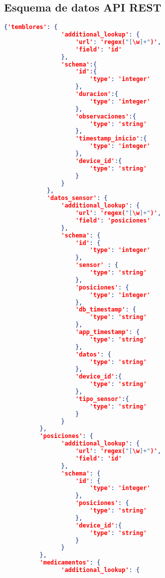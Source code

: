 \subsection{Esquema de datos API REST} \label{esquema_datos}
\begin{lstlisting}[language=json,firstnumber=1]
{'temblores': {
                'additional_lookup': {
                    'url': 'regex("[\w]+")',
                    'field': 'id'
                },
                'schema':{
                    'id':{
                        'type': 'integer'
                    },
                    'duracion':{
                        'type': 'integer'
                    },
                    'observaciones':{
                        'type': 'string'
                    },
                    'timestamp_inicio':{
                        'type': 'integer'
                    },
                    'device_id':{
                        'type': 'string'
                    }
                }
            },
            'datos_sensor': {
                'additional_lookup': {
                    'url': 'regex("[\w]+")',
                    'field': 'posiciones'
                },
                'schema': {
                    'id': {
                        'type': 'integer'
                    },
                    'sensor' : {
                        'type': 'string'
                    },
                    'posiciones': {
                        'type': 'integer'
                    },
                    'db_timestamp': {
                        'type': 'string'
                    },
                    'app_timestamp': {
                        'type': 'string'
                    },
                    'datos': {
                        'type': 'string'
                    },
                    'device_id':{
                        'type': 'string'
                    },
                    'tipo_sensor':{
                        'type': 'string'
                    }
                }
          },
          'posiciones': {
                'additional_lookup': {
                    'url': 'regex("[\w]+")',
                    'field': 'id'
                },
                'schema': {
                    'id': {
                        'type': 'integer'
                    },
                    'posiciones': {
                        'type': 'string'
                    },
                    'device_id':{
                        'type': 'string'
                    }
                }
          },
          'medicamentos': {
                'additional_lookup': {

\end{lstlisting}
